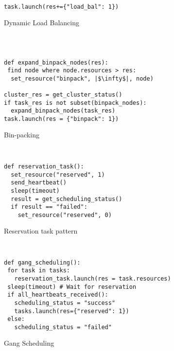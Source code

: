 \begin{figure*}[ht]
\begin{subfigure}{.24\textwidth}
\begin{verbatim}
task.launch(res+={"load_bal": 1})
  \end{verbatim}
  \caption{Dynamic Load Balancing}
  \label{fig:policycode:dynloadbal}
\end{subfigure}
~
~
\begin{subfigure}{.24\textwidth}
  \centering
  \begin{verbatim}

def expand_binpack_nodes(res):
 find node where node.resources > res:
  set_resource("binpack", |$\infty$|, node)

cluster_res = get_cluster_status()
if task_res is not subset(binpack_nodes):
  expand_binpack_nodes(task_res)
task.launch(res = {"binpack": 1})
  \end{verbatim}
  \caption{Bin-packing}
  \label{fig:policycode:binpacking}
\end{subfigure}
~
~
\begin{subfigure}{.24\textwidth}
  \centering
  \begin{verbatim}
def reservation_task():
  set_resource("reserved", 1)
  send_heartbeat()
  sleep(timeout)
  result = get_scheduling_status()
  if result == "failed":
    set_resource("reserved", 0)
  \end{verbatim}
  \caption{Reservation task pattern}
  \label{fig:policycode:reservationtask}
\end{subfigure}
~
~
\begin{subfigure}{.24\textwidth}
  \centering
  \begin{verbatim}
def gang_scheduling():
 for task in tasks:
   reservation_task.launch(res = task.resources)
 sleep(timeout) # Wait for reservation
 if all_heartbeats_received():
   scheduling_status = "success"
   tasks.launch(res={"reserved": 1})
 else:
   scheduling_status = "failed"
  \end{verbatim}
  \caption{Gang Scheduling}
  \label{fig:policycode:gangsched}
\end{subfigure}



\end{figure*}
